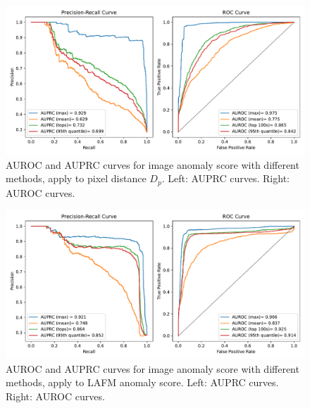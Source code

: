 \begin{figure}[htbp]
    \centering
    \includegraphics[width=0.8\linewidth]{figures/auprc-auroc-pixel.pdf}
    \caption[AUROC and AUPRC curves for image level score - Pixel distance]{AUROC and AUPRC curves for image anomaly score with different methods, apply to pixel distance $D_p$. Left: AUPRC curves. Right: AUROC curves.}
    \label{fig:auprc-auroc-curve-pixel}
\end{figure}

\begin{figure}[htbp]
    \centering
    \includegraphics[width=0.8\linewidth]{figures/auprc-auroc-lafm.pdf}
    \caption[AUROC and AUPRC curves for image level score - LAFM score]{AUROC and AUPRC curves for image anomaly score with different methods, apply to LAFM anomaly score. Left: AUPRC curves. Right: AUROC curves.}
    \label{fig:auprc-auroc-curve-lafm}
\end{figure}

